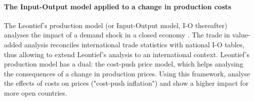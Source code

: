 \documentclass[11pt,a4paper]{paper} %
\begin{document}
\paragraph{The Input-Output model applied to a change in production costs} 
\label{subsec:io}
The Leontief's production model (or Input-Output model, I-O thereafter) analyses the impact of a demand shock in a closed economy \citep{Leontief1951}. 
The trade in value-added analysis reconciles international trade statistics with national I-O tables, thus allowing to extend Leontief's analysis to an international context.
Leontief's production model has a dual: the cost-push price model, which helps analysing the consequences of a change in production prices.
Using this framework, \cite{Cochard2016} analyse the effects of costs on prices ("cost-push inflation") and show a higher impact for more open countries.
\end{document}
